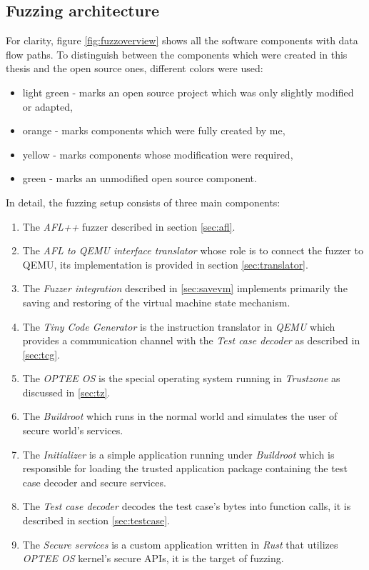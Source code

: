\subsection{Fuzzing architecture}
For clarity, figure \ref{fig:fuzzoverview} shows all the software components with data flow paths. To distinguish between the components which were created in this thesis and the open source ones, different colors were used:
\begin{itemize}
    \item \colorbox{green!30}{light green} - marks an open source project which was only slightly modified or adapted,
    \item \colorbox{orange!30}{orange} - marks components which were fully created by me,
    \item \colorbox{yellow!30}{yellow} - marks components whose modification were required,
    \item \colorbox{green!60}{green} - marks an unmodified open source component.
\end{itemize}
In detail, the fuzzing setup consists of three main components:
\begin{enumerate}
    \item The \textit{AFL++} fuzzer described in section \ref{sec:afl}.
    \item The \textit{AFL to QEMU interface translator} whose role is to connect the fuzzer to QEMU, its implementation is provided in section \ref{sec:translator}.
    \item The \textit{Fuzzer integration} described in \ref{sec:savevm} implements primarily the saving and restoring of the virtual machine state mechanism.
    \item The \textit{Tiny Code Generator} is the instruction translator in \textit{QEMU} which provides a communication channel with the \textit{Test case decoder} as described in \ref{sec:tcg}.
    \item The \textit{OPTEE OS} is the special operating system running in \textit{Trustzone} as discussed in \ref{sec:tz}.
    \item The \textit{Buildroot} which runs in the normal world and simulates the user of secure world's services.
    \item The \textit{Initializer} is a simple application running under \textit{Buildroot} which is responsible for loading the trusted application package containing the test case decoder and secure services.
    \item The \textit{Test case decoder} decodes the test case's bytes into function calls, it is described in section \ref{sec:testcase}.
    \item The \textit{Secure services} is a custom application written in \textit{Rust} that utilizes \textit{OPTEE OS} kernel's secure APIs, it is the target of fuzzing.
\end{enumerate}